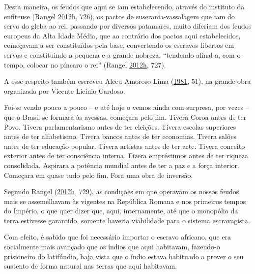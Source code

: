 \documentclass[
	12pt,				%
	oneside,			%
	a4paper,			%
	chapter=TITLE,		%
	section=TITLE,		%
	english,			%
	brazil				%
	]{abntex2}
\begin{document}
Desta maneira, os feudos que aqui se iam estabelecendo, através do instituto da
enfiteuse (Rangel \protect\hyperlink{ref-rangel1989}{2012}\protect\hyperlink{ref-rangel1989}{h}, 726), os pactos de suserania-vassalagem que iam do servo
do gleba ao rei, passando por diversos patamares, muito diferiam dos feudos
europeus da Alta Idade Média, que ao contrário dos pactos aqui estabelecidos,
começavam a ser constituídos pela base, convertendo os escravos libertos em
servos e constituindo a pequena e a grande nobreza, ``tendendo afinal a, com o
tempo, colocar no píncaro o rei'' (Rangel \protect\hyperlink{ref-rangel1989}{2012}\protect\hyperlink{ref-rangel1989}{h}, 727).

A esse respeito também escreveu Alceu Amoroso Lima (\protect\hyperlink{ref-amoroso}{1981}, 51), na grande
obra organizada por Vicente Licínio Cardoso:
\begin{citacao}
Foi-se vendo pouco a pouco – e até hoje o vemos ainda com surpresa, por vezes –
que o Brasil se formara às avessas, começara pelo fim. Tivera Coroa antes de ter
Povo. Tivera parlamentarismo antes de ter eleições. Tivera escolas superiores
antes de ter alfabetismo. Tivera bancos antes de ter economias. Tivera salões
antes de ter educação popular. Tivera artistas antes de ter arte. Tivera
conceito exterior antes de ter consciência interna. Fizera empréstimos antes de
ter riqueza consolidada. Aspirara a potência mundial antes de ter a paz e a
força interior. Começara em quase tudo pelo fim. Fora uma obra de inversão.
\end{citacao}
Segundo Rangel (\protect\hyperlink{ref-rangel1989}{2012}\protect\hyperlink{ref-rangel1989}{h}, 729), as condições em que operavam os nossos
feudos mais se assemelhavam às vigentes na República Romana e nos primeiros
tempos do Império, o que quer dizer que, aqui, internamente, até que o monopólio
da terra estivesse garantido, somente haveria viabilidade para o sistema
escravagista.

Com efeito, é sabido que foi necessário importar o escravo africano, que era
socialmente mais avançado que os índios que aqui habitavam, fazendo-o
prisioneiro do latifúndio, haja vista que o índio estava habituado a prover o
seu sustento de forma natural nas terras que aqui habitavam.
\end{document}
